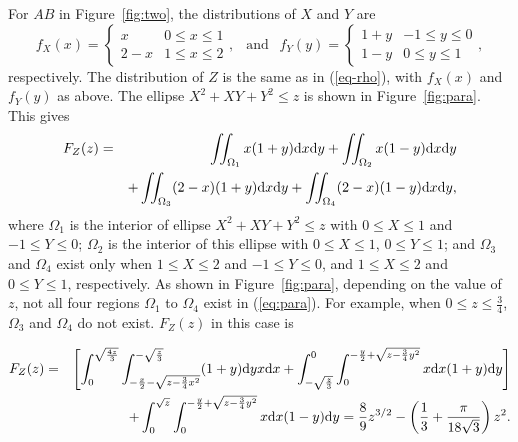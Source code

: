 \documentclass[12pt,draftclsnofoot,onecolumn]{IEEEtran}
\begin{document}
For $AB$ in Figure~\ref{fig:two}, the distributions of $X$ and $Y$ are
\begin{equation}\label{eq:fxy_para}
  f_X(x)=\left\{
    \begin{array}{lr}
      x & 0\leq x \leq 1 \\
      2-x & 1 \leq x \leq 2
    \end{array}
  \right.,
  ~~\mbox{ and }~~ f_Y(y)=\left\{
    \begin{array}{lr}
      1+y & -1\leq y \leq 0 \\
      1-y & 0 \leq y \leq 1
    \end{array}
  \right.,
\end{equation}
respectively.
The distribution of $Z$ is the same as in (\ref{eq-rho}), with
$f_X(x)$ and $f_Y(y)$ as above. The ellipse $X^2+XY+Y^2 \leq z$
is shown in Figure~\ref{fig:para}. This gives
\begin{eqnarray}\label{eq:para}
 F_Z(z)&=&\iint_{\Omega_1}x(1+y){\rm d}x{\rm d}y+\iint_{\Omega_2}x(1-y){\rm
d}x{\rm d}y\nonumber \\
&&+\iint_{\Omega_3}(2-x)(1+y){\rm d}x{\rm d}y+\iint_{\Omega_4}(2-x)(1-y){\rm
d}x{\rm d}y,
\end{eqnarray}
where $\Omega_1$ is the interior of ellipse $X^2+XY+Y^2 \leq z$ with $0 \leq X
\leq 1$ and $-1 \leq Y \leq 0$; $\Omega_2$ is the interior of this ellipse
with $0 \leq X \leq 1$, $0 \leq Y \leq 1$; and $\Omega_3$ and $\Omega_4$ exist only when
$1 \leq X \leq 2$ and $-1 \leq Y \leq 0$, and $1 \leq X \leq 2$ and $0 \leq Y
\leq 1$, respectively.
As shown in Figure~\ref{fig:para}, depending on the value of $z$, not all four regions
$\Omega_1$ to $\Omega_4$ exist in (\ref{eq:para}). For example, when $0\leq z
\leq \frac{3}{4}$, $\Omega_3$ and $\Omega_4$ do not exist. $F_Z(z)$ in this case is
\begin{small}
\begin{eqnarray}\label{eq:Z1_r_para}
 F_Z(z)&=&\left[\int_0^{\sqrt{\frac{4z}{3}}}\int_{-\frac{x}{2}-\sqrt{z-\frac{3}{
4}x^2}}^{-\sqrt{\frac{z}{3}}}(1+y){\rm d}yx{\rm d}x+\int_{-\sqrt{\frac{z}{3}}}
^0\int_0^{-\frac{y}{2}+\sqrt{z-\frac{3}{4}y^2}}x{\rm d}x(1+y){\rm d}y\right]
\nonumber\\
&&+\int_0^{\sqrt{z}}\int_0^{-\frac{y}{2}+\sqrt{z-\frac{3}{4}y^2}}
x{\rm d}x(1-y){\rm
d}y=\frac{8}{9}z^{3/2}-\left(\frac{1}{3}+\frac{\pi}{18\sqrt{3}}
\right)z^2.
\end{eqnarray}
\end{small}
\end{document}
